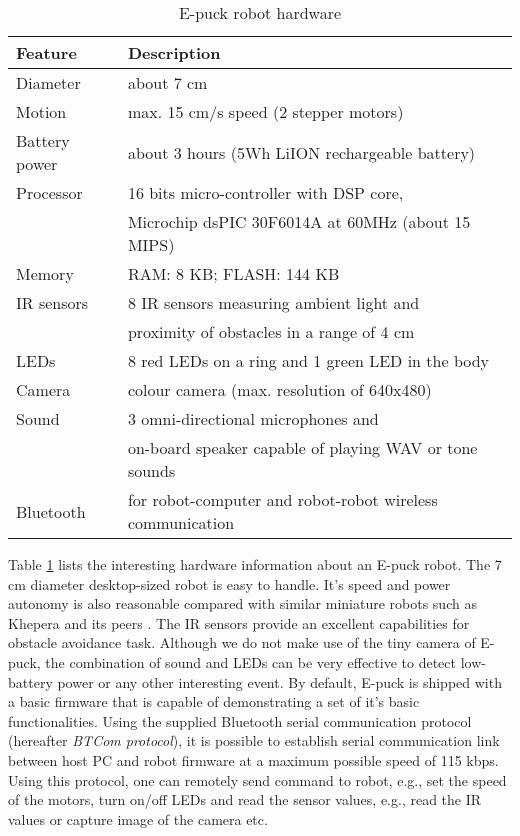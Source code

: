 \begin{table}
\caption{E-puck robot hardware}
\label{table:epuck}
\begin{center}
\begin{tabular}{|l||l|}
\hline \textbf{Feature} & \textbf{Description}\\
\hline Diameter & about 7 cm\\
\hline Motion & max. 15 cm/s speed (2 stepper motors)\\
\hline Battery power & about 3 hours  (5Wh LiION rechargeable battery)\\
\hline Processor & 16 bits micro-controller with DSP core,\\ & Microchip dsPIC 30F6014A at 60MHz (about 15 MIPS)\\
\hline Memory & RAM: 8 KB; FLASH: 144 KB \\
\hline IR sensors & 8 IR sensors measuring ambient light and \\ &  proximity of obstacles in a range of 4 cm\\
\hline LEDs & 8 red LEDs on a ring and 1 green LED in the body \\
\hline Camera & colour camera (max. resolution of 640x480) \\
\hline Sound & 3 omni-directional microphones and\\  & on-board speaker capable of playing WAV or tone sounds\\
\hline Bluetooth & for robot-computer and robot-robot wireless communication\\
\hline
\end{tabular}
\end{center}
\end{table}

Table \ref{table:epuck} lists the interesting hardware information about an E-puck robot. The 7 cm diameter desktop-sized robot is easy to handle. It's speed and power autonomy is also reasonable compared with similar miniature robots such as Khepera and its peers \cite{Mondada+2009}.  The IR sensors provide an excellent capabilities for obstacle avoidance task. Although we do not make use of the tiny camera of E-puck, the combination of sound and LEDs can be very effective to detect low-battery power or any other interesting event. By default, E-puck is shipped with a basic firmware that is capable of demonstrating a set of it's basic functionalities. Using the supplied Bluetooth serial communication protocol (hereafter {\em BTCom protocol}), it is possible to establish serial communication link between host PC and robot firmware at a maximum possible speed of 115 kbps.  Using this protocol, one can remotely send command to  robot, e.g., set the speed of the motors, turn on/off LEDs and read the sensor values, e.g., read the IR values or capture image of the camera etc.

